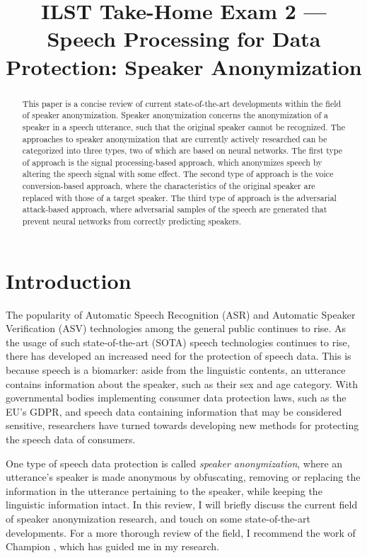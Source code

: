 \documentclass{Interspeech2024}
\title{ILST Take-Home Exam 2 --- \\Speech Processing for Data Protection: Speaker Anonymization}
\begin{document}
\maketitle


\begin{abstract}
  This paper is a concise review of current state-of-the-art developments within the field of speaker anonymization.
  Speaker anonymization concerns the anonymization of a speaker in a speech utterance, such that the original speaker cannot be recognized.
  The approaches to speaker anonymization that are currently actively researched can be categorized into three types, two of which are based on neural networks.
  The first type of approach is the signal processing-based approach, which anonymizes speech by altering the speech signal with some effect.
  The second type of approach is the voice conversion-based approach, where the characteristics of the original speaker are replaced with those of a target speaker.
  The third type of approach is the adversarial attack-based approach, where adversarial samples of the speech are generated that prevent neural networks from correctly predicting speakers.
\end{abstract}



\section{Introduction}
The popularity of Automatic Speech Recognition (ASR) and Automatic Speaker Verification (ASV) technologies among the general public continues to rise.
As the usage of such state-of-the-art (SOTA) speech technologies continues to rise, there has developed an increased need for the protection of speech data.
This is because speech is a biomarker: aside from the linguistic contents, an utterance contains information about the speaker, such as their sex and age category.
With governmental bodies implementing consumer data protection laws, such as the EU's GDPR, and speech data containing information that may be considered sensitive, researchers have turned towards developing new methods for protecting the speech data of consumers.

One type of speech data protection is called \textit{speaker anonymization}, where an utterance's speaker is made anonymous by obfuscating, removing or replacing the information in the utterance pertaining to the speaker, while keeping the linguistic information intact.
In this review, I will briefly discuss the current field of speaker anonymization research, and touch on some state-of-the-art developments.
For a more thorough review of the field, I recommend the work of Champion \cite{champion_2023_thesis}, which has guided me in my research.
\end{document}
